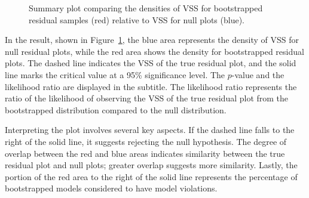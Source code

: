 \documentclass[
doublespace,
  times]{anzsauth}
\newenvironment{Shaded}{\begin{snugshade}}{\end{snugshade}}
\newcommand{\FunctionTok}[1]{\textcolor[rgb]{0.28,0.35,0.67}{#1}}
\newcommand{\NormalTok}[1]{\textcolor[rgb]{0.00,0.23,0.31}{#1}}
\newcommand{\SpecialCharTok}[1]{\textcolor[rgb]{0.37,0.37,0.37}{#1}}
\providecommand{\DIFaddbeginFL}{} %
\providecommand{\DIFaddendFL}{} %
\providecommand{\DIFdelbeginFL}{} %
\providecommand{\DIFdelendFL}{} %
\newcommand{\DIFscaledelfig}{0.5}
\newlength{\DIFdelgraphicswidth} %
\newlength{\DIFdelgraphicsheight} %
\newcommand{\DIFaddincludegraphics}[2][]{{\color{blue}\fbox{\DIFOincludegraphics[#1]{#2}}}} %
\newcommand{\DIFdelincludegraphics}[2][]{%
\sbox{\DIFdelgraphicsbox}{\DIFOincludegraphics[#1]{#2}}%
\settoboxwidth{\DIFdelgraphicswidth}{\DIFdelgraphicsbox} %
\settoboxtotalheight{\DIFdelgraphicsheight}{\DIFdelgraphicsbox} %
\scalebox{\DIFscaledelfig}{%
\parbox[b]{\DIFdelgraphicswidth}{\usebox{\DIFdelgraphicsbox}\\[-\baselineskip] \rule{\DIFdelgraphicswidth}{0em}}\llap{\resizebox{\DIFdelgraphicswidth}{\DIFdelgraphicsheight}{%
\setlength{\unitlength}{\DIFdelgraphicswidth}%
\begin{picture}(1,1)%
\thicklines\linethickness{2pt} %
{\color[rgb]{1,0,0}\put(0,0){\framebox(1,1){}}}%
{\color[rgb]{1,0,0}\put(0,0){\line( 1,1){1}}}%
{\color[rgb]{1,0,0}\put(0,1){\line(1,-1){1}}}%
\end{picture}%
}\hspace*{3pt}}} %
} %
\DeclareRobustCommand{\DIFaddbeginFL}{\DIFOaddbeginFL \let\includegraphics\DIFaddincludegraphics} %
\DeclareRobustCommand{\DIFaddendFL}{\DIFOaddendFL \let\includegraphics\DIFOincludegraphics} %
\DeclareRobustCommand{\DIFdelbeginFL}{\DIFOdelbeginFL \let\includegraphics\DIFdelincludegraphics} %
\DeclareRobustCommand{\DIFdelendFL}{\DIFOaddendFL \let\includegraphics\DIFOincludegraphics} %
\begin{document}
\begin{Shaded}
\end{Shaded}

\begin{figure}[H]

\DIFdelbeginFL %


\DIFdelendFL \DIFaddbeginFL {}
\DIFaddendFL

\caption{\label{fig-summary-plot}Summary plot comparing the densities of
VSS for bootstrapped residual samples (red) relative to VSS for null
plots (blue).}

\end{figure}%

In the result, shown in Figure~\ref{fig-summary-plot}, the blue area
represents the density of VSS for null residual plots, while the red
area shows the density for bootstrapped residual plots. The dashed line
indicates the VSS of the true residual plot, and the solid line marks
the critical value at a 95\% significance level. The \(p\)-value and the
likelihood ratio are displayed in the subtitle. The likelihood ratio
represents the ratio of the likelihood of observing the VSS of the true
residual plot from the bootstrapped distribution compared to the null
distribution.

Interpreting the plot involves several key aspects. If the dashed line
falls to the right of the solid line, it suggests rejecting the null
hypothesis. The degree of overlap between the red and blue areas
indicates similarity between the true residual plot and null plots;
greater overlap suggests more similarity. Lastly, the portion of the red
area to the right of the solid line represents the percentage of
bootstrapped models considered to have model violations.
\end{document}
